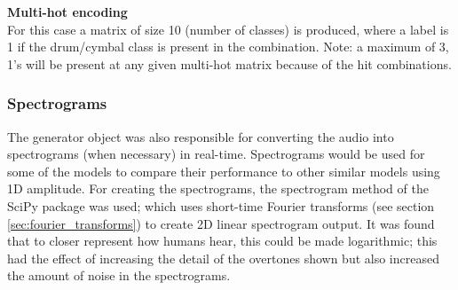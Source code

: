 \documentclass[12pt]{article}
\begin{document}
    \textbf{Multi-hot encoding}\\
    For this case a matrix of size 10 (number of classes) is produced, where a label is 1 if the drum/cymbal class is present in the combination. Note: a maximum of 3, 1's will be present at any given multi-hot matrix because of the hit combinations.
    
    \subsubsection{Spectrograms}
    \label{sec:spectrograms}
    The generator object was also responsible for converting the audio into spectrograms (when necessary) in real-time. Spectrograms would be used for some of the models to compare their performance to other similar models using 1D amplitude. For creating the spectrograms, the spectrogram method of the SciPy package was used; which uses short-time Fourier transforms (see section \ref{sec:fourier_transforms}) to create 2D linear spectrogram output. It was found that to closer represent how humans hear, this could be made logarithmic; this had the effect of increasing the detail of the overtones shown but also increased the amount of noise in the spectrograms.
    
\end{document}
